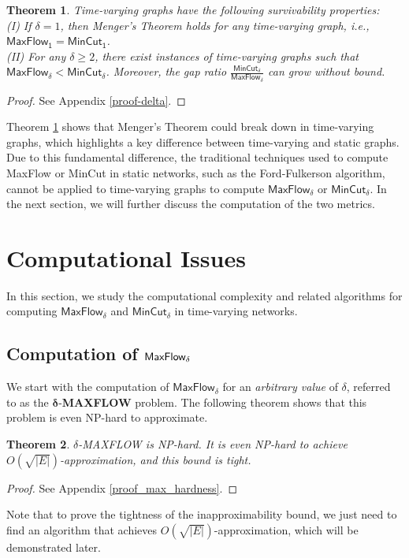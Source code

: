 \documentclass[10pt, conference, letterpaper]{IEEEtran}
\newtheorem{theorem}{Theorem}
\begin{document}
\begin{theorem}\label{delta}
Time-varying graphs have the following survivability properties:\\
(I) If $\delta=1$, then Menger's Theorem holds for any time-varying graph, i.e., $\mathsf{MaxFlow_{1}= MinCut_{1}}$.\\
(II) For any $\delta\ge 2$, there exist instances of time-varying graphs such that $\mathsf{MaxFlow_{\delta}< {MinCut_{\delta}}}$. Moreover, the gap ratio $\frac{\mathsf{MinCut_{\delta}}}{\mathsf{MaxFlow_{\delta}}}$ can grow without bound.
\end{theorem}
\begin{proof}
See Appendix \ref{proof-delta}.
\end{proof}
Theorem \ref{delta} shows that Menger's Theorem could break down in time-varying graphs, which highlights a key difference between time-varying and static graphs. Due to this fundamental difference, the traditional techniques used to compute MaxFlow or MinCut in static networks, such as the Ford-Fulkerson algorithm, cannot be applied to time-varying graphs to compute $\mathsf{MaxFlow_{\delta}}$ or $\mathsf{MinCut_{\delta}}$. In the next section, we will further discuss the computation of the two metrics.

\section{Computational Issues}\label{comp}
In this section, we study the computational complexity and related algorithms for computing $\mathsf{MaxFlow_{\delta}}$ and $\mathsf{MinCut_{\delta}}$ in time-varying networks. \subsection{Computation of { $\mathlarger{\mathsf{MaxFlow_{\delta}}}$}}\label{com_maxflow}
We start with the computation of  $\mathsf{MaxFlow_{\delta}}$ for an \emph{arbitrary value} of $\delta$, referred to as the $\boldsymbol{\delta}$-\textbf{MAXFLOW} problem.
The following theorem shows that this problem is even NP-hard to approximate.
\begin{theorem}\label{max_hardness}
$\delta$-MAXFLOW is NP-hard. It is even NP-hard to achieve $O(\sqrt{|E|})$-approximation, and this bound is tight.
\end{theorem}
\begin{proof}
See Appendix \ref{proof_max_hardness}.
\end{proof}
\noindent Note that to prove the tightness of the inapproximability bound, we just need to find an algorithm that achieves $O(\sqrt{|E|})$-approximation, which will be demonstrated later.
\end{document}
